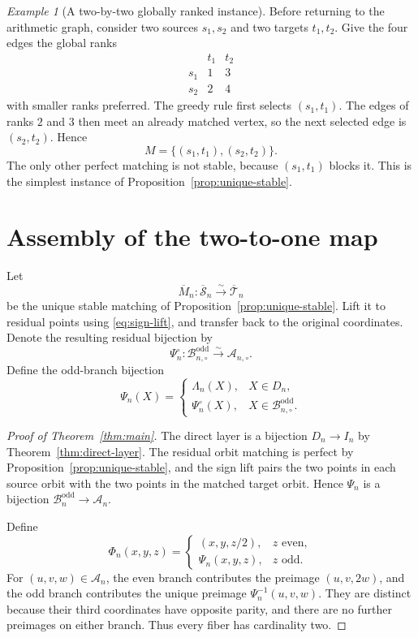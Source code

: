 \documentclass[11pt]{amsart}
\theoremstyle{definition}
\theoremstyle{remark}
\newtheorem{example}[theorem]{Example}
\newcommand{\An}{\mathcal A_n}
\newcommand{\Bodd}{\mathcal B_n^{\mathrm{odd}}}
\newcommand{\Boddres}{\mathcal B_{n,\circ}^{\mathrm{odd}}}
\newcommand{\Ares}{\mathcal A_{n,\circ}}
\newcommand{\Sbar}{\overline{\mathcal S}_n}
\newcommand{\Tbar}{\overline{\mathcal T}_n}
\begin{document}
\begin{example}[A two-by-two globally ranked instance]
\label{ex:ranked-2x2}
Before returning to the arithmetic graph, consider two sources
$s_1,s_2$ and two targets $t_1,t_2$.  Give the four edges the global ranks
\[
\begin{array}{c|cc}
 &t_1&t_2\\ \hline
s_1&1&3\\
s_2&2&4
\end{array}
\]
with smaller ranks preferred.  The greedy rule first selects $(s_1,t_1)$.
The edges of ranks $2$ and $3$ then meet an already matched vertex, so the
next selected edge is $(s_2,t_2)$.  Hence
\[
 M=\{(s_1,t_1),(s_2,t_2)\}.
\]
The only other perfect matching is not stable, because $(s_1,t_1)$ blocks it.
This is the simplest instance of Proposition~\ref{prop:unique-stable}.
\end{example}

\section{Assembly of the two-to-one map}\label{sec:assembly}

Let
\[
 \overline M_n:\Sbar\xrightarrow{\sim}\Tbar
\]
be the unique stable matching of Proposition~\ref{prop:unique-stable}.  Lift it
to residual points using \eqref{eq:sign-lift}, and transfer back to the original
coordinates.  Denote the resulting residual bijection by
\[
 \Psi_n^{\circ}:\Boddres\xrightarrow{\sim}\Ares.
\]
Define the odd-branch bijection
\[
 \Psi_n(X)=
 \begin{cases}
  \Lambda_n(X),&X\in D_n,\\
  \Psi_n^{\circ}(X),&X\in\Boddres.
 \end{cases}
\]

\begin{proof}[Proof of Theorem~\ref{thm:main}]
The direct layer is a bijection $D_n\to I_n$ by
Theorem~\ref{thm:direct-layer}.  The residual orbit matching is perfect by
Proposition~\ref{prop:unique-stable}, and the sign lift pairs the two points in
each source orbit with the two points in the matched target orbit.  Hence
$\Psi_n$ is a bijection $\Bodd\to\An$.

Define
\[
 \Phi_n(x,y,z)=
 \begin{cases}
  (x,y,z/2),&z\text{ even},\\
  \Psi_n(x,y,z),&z\text{ odd}.
 \end{cases}
\]
For $(u,v,w)\in\An$, the even branch contributes the preimage $(u,v,2w)$,
and the odd branch contributes the unique preimage $\Psi_n^{-1}(u,v,w)$.
They are distinct because their third coordinates have opposite parity, and
there are no further preimages on either branch.  Thus every fiber has
cardinality two.
\end{proof}
\end{document}
